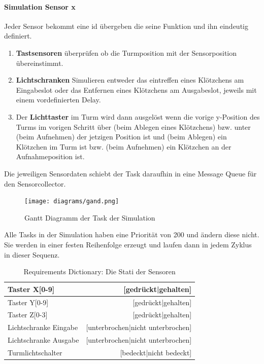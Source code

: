 \paragraph{Simulation Sensor x}
Jeder Sensor bekommt eine id übergeben die seine Funktion und ihn eindeutig definiert. 
\begin{enumerate} 
\item \textbf{Tastsensoren} überprüfen ob die Turmposition mit der Sensorposition übereinstimmt.
\item \textbf{Lichtschranken} Simulieren entweder das eintreffen eines Klötzchens am Eingabeslot oder das Entfernen eines Klötzchens am Ausgabeslot, jeweils mit einem vordefinierten Delay.
\item Der \textbf{Lichttaster} im Turm wird dann ausgelöst wenn die vorige y-Position des Turms im vorigen Schritt über (beim Ablegen eines Klötzchens) bzw. unter (beim Aufnehmen) der jetzigen Position ist und (beim Ablegen) ein Klötzchen im Turm ist bzw. (beim Aufnehmen) ein Klötzchen an der Aufnahmeposition ist.
\end{enumerate}
Die jeweiligen Sensordaten schiebt der Task daraufhin in eine Message Queue für den Sensorcollector.

\begin{figure}[H]
	\centering
  \texttt{[image: diagrams/gand.png]}
	\caption{Gantt Diagramm der Task der Simulation}
	\label{gantt}
\end{figure}

Alle Tasks in der Simulation haben eine Priorität von 200 und ändern diese nicht. Sie werden in einer festen Reihenfolge erzeugt und laufen dann in jedem Zyklus in dieser Sequenz.


\begin{table}[H]
\centering
\begin{tabular}{|l|r|}
\hline
Taster X[0-9] &  [gedrückt|gehalten] \\
\hline
Taster Y[0-9] &  [gedrückt|gehalten] \\
\hline
Taster Z[0-3] &  [gedrückt|gehalten] \\
\hline
Lichtschranke Eingabe & [unterbrochen|nicht unterbrochen] \\
\hline
Lichtschranke Ausgabe & [unterbrochen|nicht unterbrochen] \\
\hline
Turmlichtschalter & [bedeckt|nicht bedeckt]\\
\hline
\end{tabular}
\caption{Requirements Dictionary: Die Stati der Sensoren}
\label{tab:Requirements Dictionary}
\end{table}


